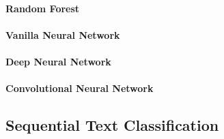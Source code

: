 \paragraph{Random Forest}
\label{par:Random Forest}

\paragraph{Vanilla Neural Network}
\label{par:Vanilla Neural Network}

\paragraph{Deep Neural Network}
\label{par:Deep Neural Network}

\paragraph{Convolutional Neural Network}
\label{par:Convolutional Neural Network}



\subsection{Sequential Text Classification}
